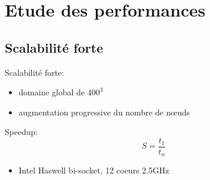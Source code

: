 \documentclass{beamer}
\begin{document}
\section{Etude des performances}
\subsection{Scalabilité forte}
\begin{frame}
  Scalabilité forte:
  \begin{itemize}
  \item domaine global de $400^3$
  \item augmentation progressive du nombre de nœuds
  \end{itemize}
  \vfill
  Speedup: $$S=\frac{t_1}{t_n}$$
\end{frame}


\begin{frame}
  \begin{itemize}
  \item Intel Haswell bi-socket, 12 coeurs 2.5GHz
  \end{itemize}%
  \centering
  
\end{frame}
\end{document}
